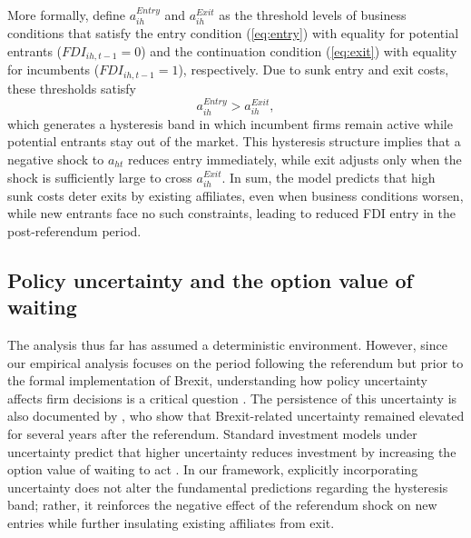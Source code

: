 \documentclass[preprint,11pt,authoryear]{elsarticle}
\begin{document}
More formally, define $a_{ih}^{Entry}$ and $a_{ih}^{Exit}$ as the threshold levels of business conditions that satisfy the entry condition (\ref{eq:entry}) with equality for potential entrants ($FDI_{ih,t-1}=0$) and the continuation condition (\ref{eq:exit}) with equality for incumbents ($FDI_{ih,t-1}=1$), respectively. Due to sunk entry and exit costs, these thresholds satisfy
\begin{equation}
a_{ih}^{Entry} > a_{ih}^{Exit},
\end{equation}
which generates a hysteresis band in which incumbent firms remain active while potential entrants stay out of the market.
This hysteresis structure implies that a negative shock to $a_{ht}$ reduces entry immediately, while exit adjusts only when the shock is sufficiently large to cross $a_{ih}^{Exit}$.
In sum, the model predicts that high sunk costs deter exits by existing affiliates, even when business conditions worsen, while new entrants face no such constraints, leading to reduced FDI entry in the post-referendum period.




\subsection{Policy uncertainty and the option value of waiting}

The analysis thus far has assumed a deterministic environment. However, since our empirical analysis focuses on the period following the referendum but prior to the formal implementation of Brexit, understanding how policy uncertainty affects firm decisions is a critical question \citep{graziano2021brexit, tamberi2024export}. 
The persistence of this uncertainty is also documented by \citet{bloom2025economic}, who show that Brexit-related uncertainty remained elevated for several years after the referendum.
Standard investment models under uncertainty predict that higher uncertainty reduces investment by increasing the option value of waiting to act \citep{dixit1992, bloom2018brexit}. 
In our framework, explicitly incorporating uncertainty does not alter the fundamental predictions regarding the hysteresis band; rather, it reinforces the negative effect of the referendum shock on new entries while further insulating existing affiliates from exit.
\end{document}
